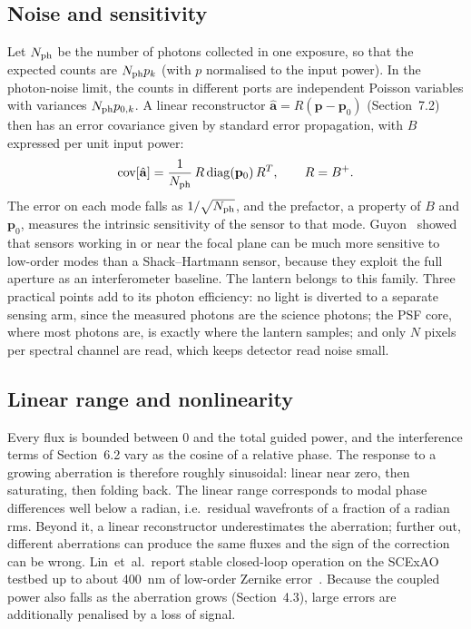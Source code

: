\documentclass[11pt,a4paper]{article}
\newcommand{\pvec}{\mathbf{p}}
\begin{document}
\subsection{Noise and sensitivity}
Let $N_{\rm ph}$ be the number of photons collected in one exposure, so that the expected counts are $N_{\rm ph} p_k$ (with $p$ normalised to the input power). In the photon-noise limit, the counts in different ports are independent Poisson variables with variances $N_{\rm ph} p_{0,k}$. A linear reconstructor $\hat{\mathbf{a}} = R(\pvec - \pvec_0)$ (Section~7.2) then has an error covariance given by standard error propagation, with $B$ expressed per unit input power:
\begin{equation}
\mathrm{cov}[\hat{\mathbf{a}}] = \frac{1}{N_{\rm ph}}\, R\, \mathrm{diag}(\pvec_0)\, R^T,
\qquad
R = B^+.
\label{eq:cov}
\end{equation}
The error on each mode falls as $1/\sqrt{N_{\rm ph}}$, and the prefactor, a property of $B$ and $\pvec_0$, measures the intrinsic sensitivity of the sensor to that mode. Guyon~\cite{Guyon2005} showed that sensors working in or near the focal plane can be much more sensitive to low-order modes than a Shack--Hartmann sensor, because they exploit the full aperture as an interferometer baseline. The lantern belongs to this family. Three practical points add to its photon efficiency: no light is diverted to a separate sensing arm, since the measured photons are the science photons; the PSF core, where most photons are, is exactly where the lantern samples; and only $N$ pixels per spectral channel are read, which keeps detector read noise small.

\subsection{Linear range and nonlinearity}
Every flux is bounded between 0 and the total guided power, and the interference terms of Section~6.2 vary as the cosine of a relative phase. The response to a growing aberration is therefore roughly sinusoidal: linear near zero, then saturating, then folding back. The linear range corresponds to modal phase differences well below a radian, i.e.\ residual wavefronts of a fraction of a radian rms. Beyond it, a linear reconstructor underestimates the aberration; further out, different aberrations can produce the same fluxes and the sign of the correction can be wrong. Lin~et~al.\ report stable closed-loop operation on the SCExAO testbed up to about \SI{400}{\nano\meter} of low-order Zernike error~\cite{Lin2023PRL}. Because the coupled power also falls as the aberration grows (Section~4.3), large errors are additionally penalised by a loss of signal.
\end{document}
